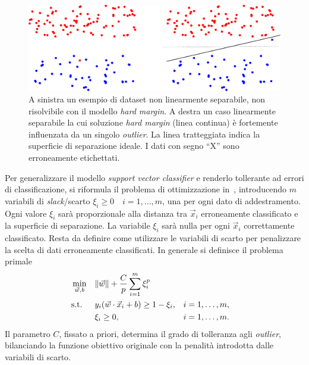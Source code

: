 \begin{figure}
    \centering
    \includegraphics[width=\linewidth]{img/casi_dove_hardmargin_va_male_o_non_va.pdf}
    \caption[Esempio problemi non risolvibili con \emph{maximal margin classifier}.]{A sinistra un esempio di dataset non linearmente separabile, non risolvibile con il modello \emph{hard margin}. A destra un caso linearmente separabile la cui soluzione \emph{hard margin} (linea continua) è fortemente influenzata da un singolo \emph{outlier}. La linea tratteggiata indica la superficie di separazione ideale.
    I dati con segno ``X'' sono erroneamente etichettati.}
    \label{fig:svc:softmargin:casi_che_hardmargin_non_risolve}
\end{figure}
Per generalizzare il modello \emph{support vector classifier} e renderlo tollerante ad errori di classificazione, si riformula il problema di ottimizzazione in~, introducendo $m$ variabili di \emph{slack}/scarto $\xi_i \geq 0 \quad i=1,...,m$, una per ogni dato di addestramento. 
Ogni valore $\xi_i$ sarà proporzionale alla distanza tra $\Vec{x}_i$ erroneamente classificato e la superficie di separazione. 
La variabile $\xi_i$ sarà nulla per ogni $\Vec{x}_i$ correttamente classificato. Resta da definire come utilizzare le variabili di scarto per penalizzare la scelta di dati erroneamente classificati. 
In generale si definisce il problema primale
\begin{equation}
\begin{aligned}
& \min_{\Vec{w},b}    && \|\Vec{w}\| + \frac{C}{p}\sum_{i=1}^{m}\xi_i^p\\
& \textrm{s.t.} && y_i(\Vec{w}\cdot\Vec{x}_i + b) \geq 1 - \xi_i, &&  i=1,\dots,m, \\
&               && \xi_i \geq 0,                 &&  i=1,\dots,m.\\
\end{aligned}
\end{equation}
Il parametro $C$, fissato a priori, determina il grado di tolleranza agli \emph{outlier}, bilanciando la funzione obiettivo originale con la penalità introdotta dalle variabili di scarto.
